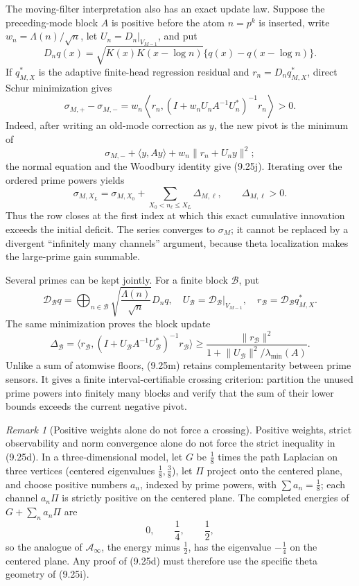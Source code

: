 \documentclass[11pt]{amsart}
\theoremstyle{definition}
\theoremstyle{remark}
\newtheorem{remark}[theorem]{Remark}
\begin{document}
The moving-filter interpretation also has an exact update law.  Suppose
the preceding-mode block \(A\) is positive before the atom
\(n=p^k\) is inserted, write \(w_n=\Lambda(n)/\sqrt n\), let
\(U_n=D_n|_{V_{M-1}}\), and put
\[
 D_nq(x)=\sqrt{K(x)K(x-\log n)}
          \{q(x)-q(x-\log n)\}.
\tag{9.25i}
\]
If \(q_{M,X}^*\) is the adaptive finite-head regression residual and
\(r_n=D_nq_{M,X}^*\), direct Schur minimization gives
\[
 \boxed{
 \sigma_{M,+}-\sigma_{M,-}
 =w_n\left\langle r_n,
 (I+w_nU_nA^{-1}U_n^*)^{-1}r_n\right\rangle>0.}
\tag{9.25j}
\]
Indeed, after writing an old-mode correction as \(y\), the new pivot is
the minimum of
\[
 \sigma_{M,-}+\langle y,Ay\rangle
 +w_n\lVert r_n+U_ny\rVert^2;
\]
the normal equation and the Woodbury identity give (9.25j).  Iterating
over the ordered prime powers yields
\[
 \sigma_{M,X_L}=\sigma_{M,X_0}
 +\sum_{X_0<n_\ell\le X_L}\Delta_{M,\ell},
 \qquad \Delta_{M,\ell}>0.
\tag{9.25k}
\]
Thus the row closes at the first index at which this exact cumulative
innovation exceeds the initial deficit.  The series converges to
\(\sigma_M\); it cannot be replaced by a divergent ``infinitely many
channels'' argument, because theta localization makes the large-prime
gain summable.

Several primes can be kept jointly.  For a finite block \(\mathcal B\),
put
\[
 \mathcal D_{\mathcal B}q
 =\bigoplus_{n\in\mathcal B}\sqrt{\frac{\Lambda(n)}{\sqrt n}}D_nq,
 \quad U_{\mathcal B}=\mathcal D_{\mathcal B}|_{V_{M-1}},
 \quad r_{\mathcal B}=\mathcal D_{\mathcal B}q_{M,X}^*.
\tag{9.25l}
\]
The same minimization proves the block update
\[
 \Delta_{\mathcal B}
 =\langle r_{\mathcal B},
 (I+U_{\mathcal B}A^{-1}U_{\mathcal B}^*)^{-1}
 r_{\mathcal B}\rangle
 \ge\frac{\lVert r_{\mathcal B}\rVert^2}
 {1+\lVert U_{\mathcal B}\rVert^2/\lambda_{\min}(A)}.
\tag{9.25m}
\]
Unlike a sum of atomwise floors, (9.25m) retains complementarity between
prime sensors.  It gives a finite interval-certifiable crossing criterion:
partition the unused prime powers into finitely many blocks and verify that
the sum of their lower bounds exceeds the current negative pivot.

\begin{remark}[Positive weights alone do not force a crossing]
Positive weights, strict observability and norm convergence alone do not
force the strict inequality in (9.25d).  In a three-dimensional model,
let \(G\) be \(\frac18\) times the path Laplacian on three vertices
(centered eigenvalues \(\frac18,\frac38\)), let \(\Pi\) project onto the
centered plane, and choose positive numbers \(a_n\), indexed by prime
powers, with \(\sum a_n=\frac18\); each channel \(a_n\Pi\) is strictly
positive on the centered plane.  The completed energies of
\(G+\sum_na_n\Pi\) are
\[
 0,\qquad\frac14,\qquad\frac12,
\tag{9.25n}
\]
so the analogue of \(\mathcal A_\infty\), the energy minus
\(\frac12\), has the eigenvalue \(-\frac14\) on the centered plane.  Any
proof of (9.25d) must therefore use the specific theta geometry of
(9.25i).
\end{remark}
\end{document}
